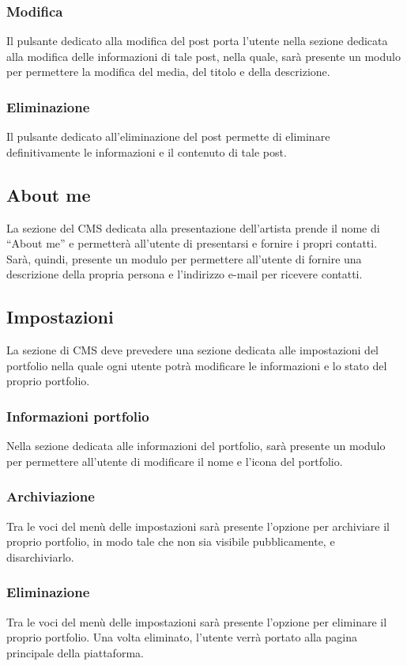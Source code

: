 \subsubsection{Modifica}
Il pulsante dedicato alla modifica del post porta l'utente nella sezione dedicata alla modifica delle informazioni di tale post, nella quale, sar\`a presente un modulo per permettere la modifica del media, del titolo e della descrizione.

\subsubsection{Eliminazione}
Il pulsante dedicato all'eliminazione del post permette di eliminare definitivamente le informazioni e il contenuto di tale post.


\subsection{About me}
La sezione del CMS dedicata alla presentazione dell'artista prende il nome di ``About me'' e permetter\`a all'utente di presentarsi e fornire i propri contatti. Sar\`a, quindi, presente un modulo per permettere all'utente di fornire una descrizione della propria persona e l'indirizzo e-mail per ricevere contatti.

\subsection{Impostazioni}
La sezione di CMS deve prevedere una sezione dedicata alle impostazioni del portfolio nella quale ogni utente potr\`a modificare le informazioni e lo stato del proprio portfolio.

\subsubsection{Informazioni portfolio}
Nella sezione dedicata alle informazioni del portfolio, sar\`a presente un modulo per permettere all'utente di modificare il nome e l'icona del portfolio.

\subsubsection{Archiviazione}
Tra le voci del men\`u delle impostazioni sar\`a presente l'opzione per archiviare il proprio portfolio, in modo tale che non sia visibile pubblicamente, e disarchiviarlo.

\subsubsection{Eliminazione}
Tra le voci del men\`u delle impostazioni sar\`a presente l'opzione per eliminare il proprio portfolio. Una volta eliminato, l'utente verr\`a portato alla pagina principale della piattaforma.

